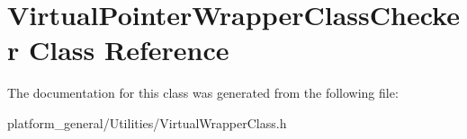 \hypertarget{classVirtualPointerWrapperClassChecker}{\section{\-Virtual\-Pointer\-Wrapper\-Class\-Checker \-Class \-Reference}
\label{classVirtualPointerWrapperClassChecker}
}


\-The documentation for this class was generated from the following file\-:\begin{DoxyCompactItemize}
\item 
platform\-\_\-general/\-Utilities/\-Virtual\-Wrapper\-Class.\-h\end{DoxyCompactItemize}
